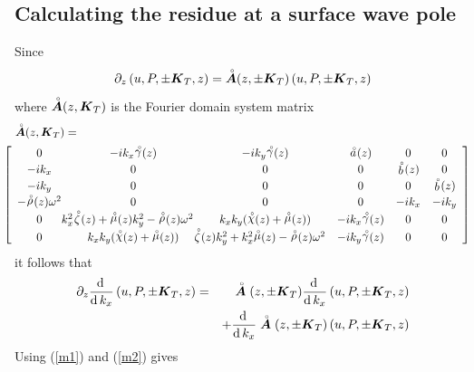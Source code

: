 \subsection{Calculating the residue at a surface wave pole}
Since
\begin{equation} 	\label{m1}
	{ \partial }_{z}\left(u,P,\pm{\mbox{\boldmath$\mit K$\unboldmath}}_{T},z\right)=
	{\stackrel{\scriptscriptstyle _{\,\,\circ}}{ \mbox{\boldmath$\mit A$\unboldmath}}}(z,\pm{\mbox{\boldmath$\mit K$\unboldmath}}_{T})\left(u,P,\pm{\mbox{\boldmath$\mit K$\unboldmath}}_{T},z\right)
\end{equation}
where  ${\stackrel{\scriptscriptstyle _{\,\,\circ}}{ \mbox{\boldmath$\mit A$\unboldmath}}}(z,{\mbox{\boldmath$\mit K$\unboldmath}}_{T})$ is the Fourier domain system matrix
\begin{eqnarray} \label{Akzdef}
\lefteqn{
{\rf{\bmi A}}(z,{\bmi K}_{T})
=}\\
&&\!\!\!\!\!\!\!\!\!\!\!\!
\left[{\begin{array}{cccccc}
0&- i k_x {\rf \gamma}(z) &  -i {  k}_{  y} {\rf \gamma}(z) &  {\rf a}(z)&0&0\\ 
-i k_x&0&0&0&{\rf b}(z)&0\\ -i{k}_{y}&0&0&0&0&{\rf b}(z)\\ - {\rf \rho}(z) 
{\omega }^{  2}&  0&0&0&-i k_x&-i{k}_{y}\\ 0&\!\!\!\!\!\!
k^{2}_x{\rf \zeta}(z)  + {\rf \mu}(z) {  k}_{  y}^{  2}- {\rf \rho}(z) {\omega 
}^{  2} &  
{k}_{x}{k}_{y} ({\rf \chi}(z)+ {\rf \mu}(z))&  -i {k}_{x} {\rf \gamma}(z) &  0&0\\ 
0&{k}_{x}{k}_{y} ({\rf \chi}(z)+ {\rf \mu}(z)) & \!\!\! \!\!\!
{\rf \zeta }(z){  k}_{  y}^{  2}  + {  k}_{  x}^{  2} {\rf \mu}(z) 
- {\rf \rho}(z) {\omega }^{  2}   &  -i{k}_{y} {\rf \gamma}(z) &  
0&0\end{array}}\right]\nonumber
\end{eqnarray}
it follows that
\begin{eqnarray} 	\label{m2}
{\partial }_{z}{\frac{{\rm d}\,}{{\rm 
d}\,{ k}_{x}}}\left({u,P,\pm{\mbox{\boldmath$\mit K$\unboldmath}}_{T},z}\right)&=&
\stackrel{\scriptscriptstyle _{\,\,\circ}}{ \mbox{\boldmath$\mit A$\unboldmath}}(z,\pm{\mbox{\boldmath$\mit K$\unboldmath}}_{T}){\frac{{\rm d}\,}{{\rm 
d}\,{ k}_{x}}}\left({u,P,\pm{\mbox{\boldmath$\mit K$\unboldmath}}_{T},z}\right)\nonumber\\
&&
+
{\frac{{\rm d}\,}{{\rm 
d}\,{ k}_{x}}}\stackrel{\scriptscriptstyle _{\,\,\circ}}{ \mbox{\boldmath$\mit A$\unboldmath}}(z,\pm{\mbox{\boldmath$\mit K$\unboldmath}}_{T})\left({u,P,\pm{\mbox{\boldmath$\mit K$\unboldmath}}_{T},z}\right)
\end{eqnarray}
Using  (\ref{m1}) and (\ref{m2}) gives
